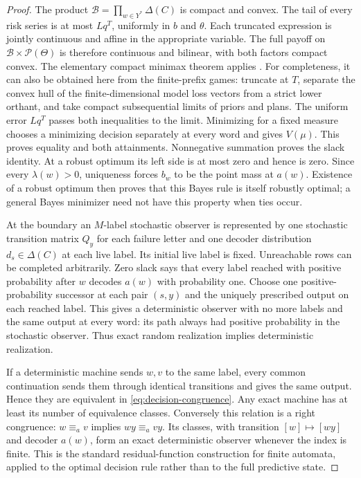 \begin{proof}
The product $\mathcal B=\prod_{w\in Y^*}\Delta(C)$ is compact and convex. The tail of every risk series is at most $Lq^T$, uniformly in $b$ and $\theta$. Each truncated expression is jointly continuous and affine in the appropriate variable. The full payoff on $\mathcal B\times\mathcal P(\Theta)$ is therefore continuous and bilinear, with both factors compact convex. The elementary compact minimax theorem applies \cite{Sion58}. For completeness, it can also be obtained here from the finite-prefix games: truncate at $T$, separate the convex hull of the finite-dimensional model loss vectors from a strict lower orthant, and take compact subsequential limits of priors and plans. The uniform error $Lq^T$ passes both inequalities to the limit. Minimizing for a fixed measure chooses a minimizing decision separately at every word and gives $V(\mu)$. This proves equality and both attainments. Nonnegative summation proves the slack identity. At a robust optimum its left side is at most zero and hence is zero. Since every $\lambda(w)>0$, uniqueness forces $b_w$ to be the point mass at $a(w)$. Existence of a robust optimum then proves that this Bayes rule is itself robustly optimal; a general Bayes minimizer need not have this property when ties occur.

At the boundary an $M$-label stochastic observer is represented by one stochastic transition matrix $Q_y$ for each failure letter and one decoder distribution $d_s\in\Delta(C)$ at each live label. Its initial live label is fixed. Unreachable rows can be completed arbitrarily. Zero slack says that every label reached with positive probability after $w$ decodes $a(w)$ with probability one. Choose one positive-probability successor at each pair $(s,y)$ and the uniquely prescribed output on each reached label. This gives a deterministic observer with no more labels and the same output at every word: its path always had positive probability in the stochastic observer. Thus exact random realization implies deterministic realization.

If a deterministic machine sends $w,v$ to the same label, every common continuation sends them through identical transitions and gives the same output. Hence they are equivalent in \eqref{eq:decision-congruence}. Any exact machine has at least its number of equivalence classes. Conversely this relation is a right congruence: $w\equiv_a v$ implies $wy\equiv_a vy$. Its classes, with transition $[w]\mapsto[wy]$ and decoder $a(w)$, form an exact deterministic observer whenever the index is finite. This is the standard residual-function construction for finite automata, applied to the optimal decision rule rather than to the full predictive state.


\end{proof}

